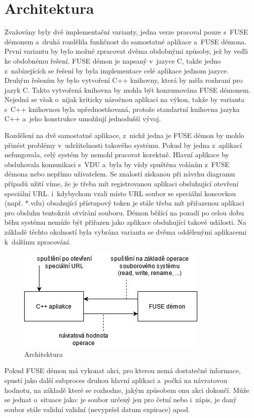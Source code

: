 \section{Architektura}

Zvažovány byly dvě implementační varianty, jedna verze pracoval pouze s FUSE démonem a druhá rozdělila funkčnost do samostatné aplikace a FUSE démona. První variantu by
bylo možné zpracovat dvěma obdobnými způsoby, jež by vedli ke obdobnému řešení. FUSE démon je napsaný v jazyce C, takže jedno z nabízejících se řešení by byla implementace
celé aplikace jednom jazyce. Druhým řešením by bylo vytvoření C++ knihovny, která by měla rozhraní pro jazyk C. Takto vytvořená knihovna by mohla být konzumována FUSE démonem.
Nejedná se však o nijak kriticky náročnou aplikaci na výkon, takže by varianta s C++ knihovnou byla upřednostňovaná, protože standartní knihovna jazyka C++ a jeho konstrukce 
umožňují jednodušší vývoj.

Rozdělení na dvě samostatné aplikace, z nichž jedna je FUSE démon by mohlo přinést problémy v udržitelnosti takového systému. Pokud by jedna z aplikací nefungovala, celý systém
by nemohl pracovat korektně. Hlavní aplikace by obsluhovala komunikaci s VDU a byla by vždy spuštěna voláním z FUSE démona nebo nepřímo uživatelem. Se znalostí 
získanou při návrhu diagramu případů užití víme, že je třeba mít registrovanou aplikaci obsluhující otevření speciální URL. i kdybychom vzali místo URL soubor se speciální
koncovkou (např. *.vdu) obsahující přístupový token je stále třeba mít přiřazenou aplikaci pro obsluhu tentokrát otvírání souboru. Démon běžící na pozadí po celou dobu běhu
systému nemůže být přiřazen jako aplikace obsluhující takové události. Na základě těchto okolností byla vybrána varianta se dvěma oddělenými aplikacemi k dalšímu zpracování.

\begin{figure}[h]
    \centering
    \includegraphics[width=0.47\linewidth]{other-fig/architecture.png}
    \caption{Architektura}
\end{figure}

Pokud FUSE démon má vykonat akci, pro kterou nemá dostatečné informace, spustí jako další subproces druhou hlavní aplikaci a počká na návratovou hodnotu, na základě
které se rozhodne, jakým způsobem onu akci dokončí. Může se jednat o situace jako: je soubor určený jen pro četní nebo i zápis, je daný soubor stále validní
validní (nevypršel datum expirace) apod.

